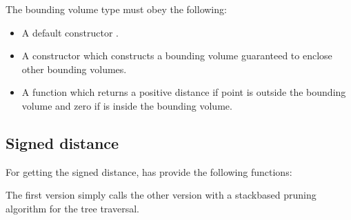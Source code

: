 \documentclass[letterpaper,10pt,english]{sphinxmanual}
\begin{document}
\sphinxAtStartPar
The bounding volume type  must obey the following:
\begin{itemize}
\item {} 
\sphinxAtStartPar
A default constructor .

\item {} 
\sphinxAtStartPar
A constructor  which constructs a bounding volume guaranteed to enclose other bounding volumes.

\item {} 
\sphinxAtStartPar
A function  which returns a positive distance if point  is outside the bounding volume and zero if  is inside the bounding volume.

\end{itemize}


\subsection{Signed distance}
\label{\detokenize{ImplemBVH:signed-distance}}
\sphinxAtStartPar
For getting the signed distance,  has provide the following functions:

\begin{sphinxVerbatim}[commandchars=\\\{\}]
 
     

 
       
\end{sphinxVerbatim}

\sphinxAtStartPar
The first version simply calls the other version with a stack\sphinxhyphen{}based pruning algorithm for the tree traversal.
\end{document}
